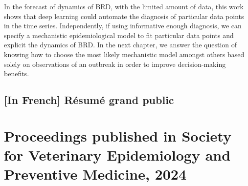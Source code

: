 In the forecast of dynamics of BRD, with the limited amount of data, this work shows that deep learning could automate the diagnosis of particular data points in the time series. Independently, if using informative enough diagnosis, we can specify a mechanistic epidemiological model to fit particular data points and explicit the dynamics of BRD. In the next chapter, we answer the question of knowing how to choose the most likely mechanistic model amongst others based solely on observations of an outbreak in order to improve decision-making benefits.


\subsection{[In French] Résumé grand public}

\section{Proceedings published in Society for Veterinary Epidemiology and Preventive Medicine, 2024}



